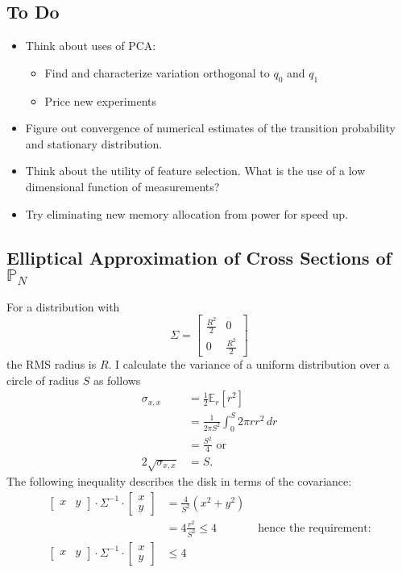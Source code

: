 \documentclass[]{article}
\newcommand{\field}[1]{\mathbb{#1}}
\newcommand\Polytope[1]{\field{P}_{#1}}
\newcommand\PolytopeN{\Polytope{N}}
\newcommand{\EV}[2]{\field{E}_{#1}\left[#2\right]}
\begin{document}
\subsection{To Do}
\begin{itemize}
\item Think about uses of PCA:
  \begin{itemize}
  \item Find and characterize variation orthogonal to $q_0$ and $q_1$
  \item Price new experiments
  \end{itemize}
\item Figure out convergence of numerical estimates of the transition
  probability and stationary distribution.
\item Think about the utility of feature selection.  What is the use
  of a low dimensional function of measurements?
\item Try eliminating new memory allocation from power for speed up.
\end{itemize}

\subsection{Elliptical Approximation of Cross Sections of
  $\PolytopeN$}
\label{sec:ellipse}
For a distribution with
\begin{equation*}
  \Sigma = \begin{bmatrix} \frac{R^2}{2} &0 \\ 0 &
    \frac{R^2}{2} \end{bmatrix} 
\end{equation*}
the RMS radius is $R$.  I calculate the variance of a uniform
distribution over a circle of radius $S$ as follows
\begin{align*}
  \sigma_{x,x} &= \frac{1}{2} \EV{r}{r^2} \\
  &= \frac{1}{2\pi S^2} \int_0^S 2\pi r r^2 \, dr \\
  &= \frac{S^2}{4} \text{ or}\\
  2\sqrt{\sigma_{x,x}} &= S.
\end{align*}
The following inequality describes the disk in terms of the covariance:
\begin{align*}
  \begin{bmatrix} x & y \end{bmatrix} \cdot \Sigma^{-1}
  \cdot \begin{bmatrix} x\\y \end{bmatrix} &= \frac{4}{S^2} 
  \left( x^2 + y^2 \right) \\
  &= 4 \frac{r^2}{S^2} \leq 4 &\text{ hence the requirement:} \\
  \begin{bmatrix} x & y \end{bmatrix} \cdot \Sigma^{-1}
  \cdot \begin{bmatrix} x\\y \end{bmatrix} &\leq 4  
\end{align*}
\end{document}
